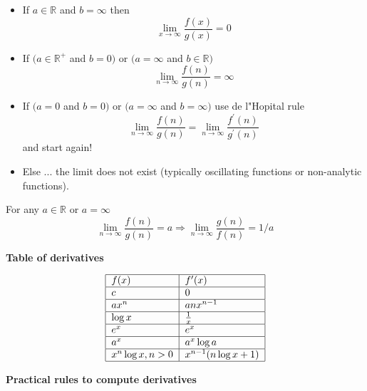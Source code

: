 \documentclass[justified, sixbynine]{tufte-book}
\def\subsubsection#1{{\bf #1}}
\theoremstyle{plain}%
\newtheorem * {corollary}{Corollary}
\theoremstyle{definition}
\theoremstyle{remark}
\newtheorem * {remark}{Remark}
\newtheorem * {note}{Note}
\begin{document}
\begin{fullwidth}
\begin{itemize}
\item  If $a\in \mathbb{R}$ and $b=\infty $ then
\begin{equation}
\lim_{x\rightarrow \infty }\frac{f(x)}{g(x)}=0
\end{equation}

\item  If $(a\in \mathbb{R}^{+}$ and $b=0)$ or $(a=\infty$ and $b\in
\mathbb{R})$
\begin{equation}
\lim_{n\rightarrow \infty }\frac{f(n)}{g(n)}=\infty
\end{equation}

\item  If $(a=0$ and $b=0)$ or $(a=\infty$ and $b=\infty)$
use de l"Hopital rule
\begin{equation}
\lim_{n\rightarrow \infty }\frac{f(n)}{g(n)}=\lim_{n\rightarrow \infty }%
\frac{f^{\prime }(n)}{g^{\prime }(n)}
\end{equation}
and start again!

\item  Else ... the limit does not exist (typically oscillating functions or
non-analytic functions).
\end{itemize}

For any $a\in \mathbb{R}$ or $a=\infty $%
\begin{equation}
\lim_{n\rightarrow \infty }\frac{f(n)}{g(n)}=a\Rightarrow \lim_{n\rightarrow
\infty }\frac{g(n)}{f(n)}=1/a
\end{equation}

\subsubsection{Table of derivatives}

\begin{equation}
\begin{tabular}{|l|l|}
\hline
$f(x)$ & $f^{\prime }(x)$ \\ \hline
$c$ & $0$ \\ \hline
$ax^n$ & $anx^{n-1}$ \\ \hline
$\log x$ & $\frac 1x$ \\ \hline
$e^x$ & $e^x$ \\ \hline
$a^x$ & $a^x\log a$ \\ \hline
$x^n\log x, n>0$ & $x^{n-1}(n\log x+1)$ \\ \hline
\end{tabular}
\end{equation}

\subsubsection{Practical rules to compute derivatives}


\end{fullwidth}
\end{document}
